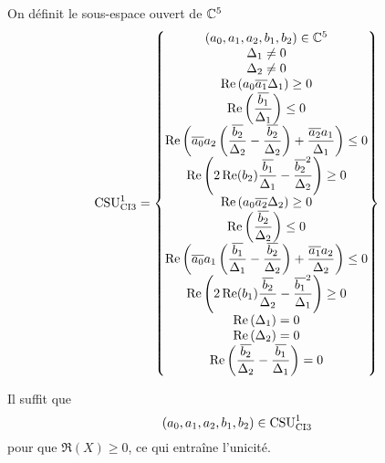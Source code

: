   \begin{defn}
    \label{def:csu:ci3-1}

    On définit le sous-espace ouvert de \(\CC^5\)
    \begin{equation*}
      \CSU[1]{CI3} = \left\lbrace 
      \begin{matrix}
      (a_0,a_1,a_2,b_1,b_2) \in \CC^5
      \\
      \Delta_1 \not = 0
      \\
      \Delta_2 \not = 0
      \\
      \Re\left(a_0\conj{a_1}\Delta_1\right) \ge 0
      \\
      \Re\left(\frac{\conj{b_1}}{\Delta_1}\right) \le 0
      \\
      \Re\left(\conj{a_0}a_2\left(\frac{\conj{b_2}}{\Delta_2}-\frac{\conj{b_2}}{\Delta_2}\right) + \frac{\conj{a_2}a_1}{\Delta_1} \right)\le 0
      \\
      \Re\left(2\Re(b_2)\frac{\conj{b_1}}{\Delta_1}-\frac{\conj{b_2}^2}{\Delta_2}\right) \ge 0
      \\
      \Re\left(a_0\conj{a_2}\Delta_2\right) \ge 0
      \\
      \Re\left(\frac{\conj{b_2}}{\Delta_2}\right) \le 0
      \\
      \Re\left(\conj{a_0}a_1\left(\frac{\conj{b_1}}{\Delta_1}-\frac{\conj{b_2}}{\Delta_2}\right) + \frac{\conj{a_1}a_2}{\Delta_2} \right)\le 0
      \\
      \Re\left(2\Re(b_1)\frac{\conj{b_2}}{\Delta_2}-\frac{\conj{b_1}^2}{\Delta_1}\right) \ge 0
      \\
      \Re\left(\Delta_1\right) = 0
      \\
      \Re\left(\Delta_2\right) = 0
      \\
      \Re\left(\frac{\conj{b_2}}{\Delta_2}-\frac{\conj{b_1}}{\Delta_1}\right) = 0
      \end{matrix}
      \right\rbrace
    \end{equation*}
  \end{defn}
  
 \begin{prop}
    \label{prop:csu:ci3-1}
    Il suffit que
    \begin{equation*}
      (a_0,a_1,a_2,b_1,b_2) \in \CSU[1]{CI3}
    \end{equation*}
    pour que \(\Re(X)\ge 0\), ce qui entraîne l'unicité.
  \end{prop}

